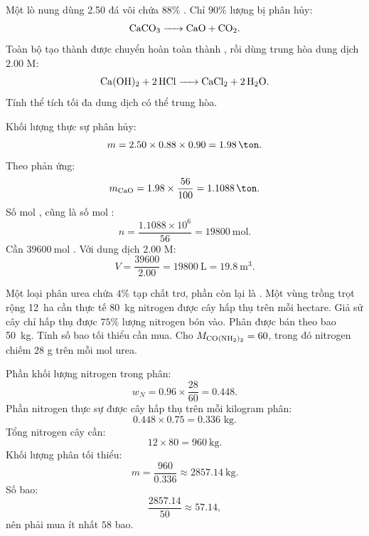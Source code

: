 \begin{tuluyen}
Một lò nung dùng \SI{2.50}{\ton} đá vôi chứa \(88\%\) . Chỉ \(90\%\) lượng  bị phân hủy:
\[
\ce{CaCO3 -> CaO + CO2}.
\]
Toàn bộ  tạo thành được chuyển hoàn toàn thành , rồi dùng trung hòa dung dịch  \(2.00\) M:
\[
\ce{Ca(OH)2 + 2HCl -> CaCl2 + 2H2O}.
\]
Tính thể tích tối đa dung dịch  có thể trung hòa.
\begin{loigiaiBT}
Khối lượng  thực sự phân hủy:
\[
m=2.50\times0.88\times0.90=\SI{1.98}{\ton}.
\]
Theo phản ứng:
\[
m_{\ce{CaO}}=1.98\times\frac{56}{100}=\SI{1.1088}{\ton}.
\]
Số mol , cũng là số mol :
\[
n=\frac{1.1088\times10^6}{56}=\SI{19800}{\mole}.
\]
Cần \(\SI{39600}{\mole}\) . Với dung dịch \(2.00\) M:
\[
V=\frac{39600}{2.00}=\SI{19800}{\liter}=\SI{19.8}{\cubic\metre}.
\]
\end{loigiaiBT}
\end{tuluyen}

\begin{tuluyen}
Một loại phân urea chứa \(4\%\) tạp chất trơ, phần còn lại là . Một vùng trồng trọt rộng \SI{12}{\hectare} cần thực tế \SI{80}{\kilo\gram} nitrogen được cây hấp thụ trên mỗi hectare. Giả sử cây chỉ hấp thụ được \(75\%\) lượng nitrogen bón vào. Phân được bán theo bao \SI{50}{\kilo\gram}. Tính số bao tối thiểu cần mua. Cho \(M_{\ce{CO(NH2)2}}=60\), trong đó nitrogen chiếm \(28\) g trên mỗi mol urea.
\begin{loigiaiBT}
Phần khối lượng nitrogen trong phân:
\[
w_N=0.96\times\frac{28}{60}=0.448.
\]
Phần nitrogen thực sự được cây hấp thụ trên mỗi kilogram phân:
\[
0.448\times0.75=0.336\text{ kg}.
\]
Tổng nitrogen cây cần:
\[
12\times80=\SI{960}{\kilo\gram}.
\]
Khối lượng phân tối thiểu:
\[
m=\frac{960}{0.336}\approx\SI{2857.14}{\kilo\gram}.
\]
Số bao:
\[
\frac{2857.14}{50}\approx57.14,
\]
nên phải mua ít nhất \(58\) bao.
\end{loigiaiBT}
\end{tuluyen}

